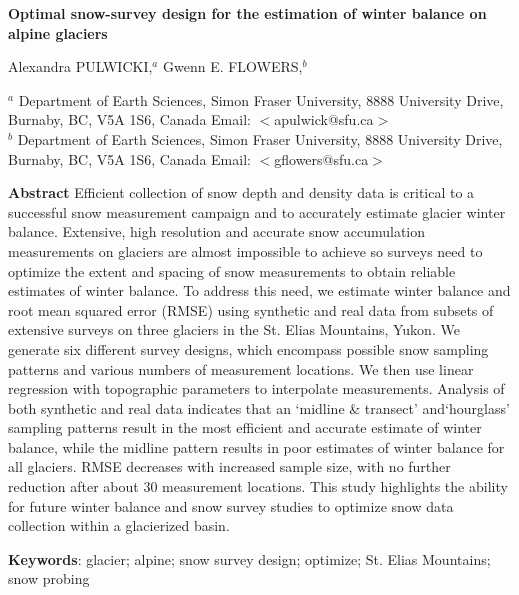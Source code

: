\documentclass{article}
\begin{document}
{\center
{\large \textbf{Optimal snow-survey design for the estimation of winter balance on alpine glaciers}}}
\vspace{0.3cm}

{\center 
Alexandra PULWICKI,$^a$ Gwenn E. FLOWERS,$^b$}

\vspace{0.3cm}

\noindent$^a$ Department of Earth Sciences, Simon Fraser University, 8888 University Drive, Burnaby, BC, V5A 1S6, Canada
  Email: $<$apulwick@sfu.ca$>$\\
\noindent $^b$ Department of Earth Sciences, Simon Fraser University, 8888 University Drive, Burnaby, BC, V5A 1S6, Canada
 Email: $<$gflowers@sfu.ca$>$ 

\vspace{0.3cm}
\noindent \textbf{Abstract}  Efficient collection of snow depth and density data is critical to a successful snow measurement campaign and to accurately estimate glacier winter balance. Extensive, high resolution and accurate snow accumulation measurements on glaciers are almost impossible to achieve so surveys need to optimize the extent and spacing of snow measurements to obtain reliable estimates of winter balance. To address this need, we estimate winter balance and root mean squared error (RMSE) using synthetic and real data from subsets of extensive surveys on three glaciers in the St. Elias Mountains, Yukon. We generate six different survey designs, which encompass possible snow sampling patterns and various numbers of measurement locations. We then use linear regression with topographic parameters to interpolate measurements. Analysis of both synthetic and real data indicates that an `midline \& transect' and`hourglass' sampling patterns result in the most efficient and accurate estimate of winter balance, while the midline pattern results in poor estimates of winter balance for all glaciers. RMSE decreases with increased sample size, with no further reduction after about 30 measurement locations. This study highlights the ability for future winter balance and snow survey studies to optimize snow data collection within a glacierized basin.

\vspace{0.3cm} 
\noindent\textbf{Keywords}: glacier; alpine; snow survey design; optimize; St. Elias Mountains; snow probing

\pagebreak
\end{document}
